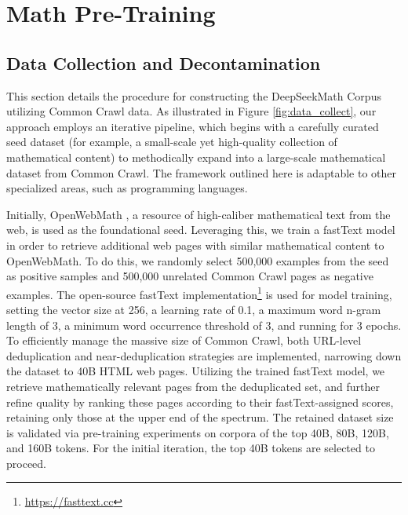 \section{Math Pre-Training}

\subsection{Data Collection and Decontamination} This section details the procedure for constructing the DeepSeekMath Corpus utilizing Common Crawl data. As illustrated in Figure \ref{fig:data_collect}, our approach employs an iterative pipeline, which begins with a carefully curated seed dataset (for example, a small-scale yet high-quality collection of mathematical content) to methodically expand into a large-scale mathematical dataset from Common Crawl. The framework outlined here is adaptable to other specialized areas, such as programming languages.

Initially, OpenWebMath \citep{openwebmath}, a resource of high-caliber mathematical text from the web, is used as the foundational seed. Leveraging this, we train a fastText model \citep{joulin2016fasttext} in order to retrieve additional web pages with similar mathematical content to OpenWebMath. To do this, we randomly select 500,000 examples from the seed as positive samples and 500,000 unrelated Common Crawl pages as negative examples. The open-source fastText implementation\footnote{\url{https://fasttext.cc}} is used for model training, setting the vector size at 256, a learning rate of 0.1, a maximum word n-gram length of 3, a minimum word occurrence threshold of 3, and running for 3 epochs. To efficiently manage the massive size of Common Crawl, both URL-level deduplication and near-deduplication strategies are implemented, narrowing down the dataset to 40B HTML web pages. Utilizing the trained fastText model, we retrieve mathematically relevant pages from the deduplicated set, and further refine quality by ranking these pages according to their fastText-assigned scores, retaining only those at the upper end of the spectrum. The retained dataset size is validated via pre-training experiments on corpora of the top 40B, 80B, 120B, and 160B tokens. For the initial iteration, the top 40B tokens are selected to proceed.


